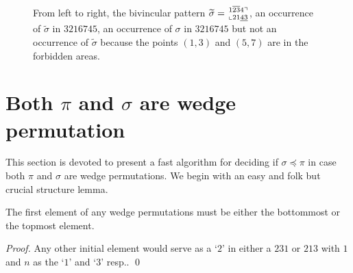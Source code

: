 \documentclass[a4paper]{llncs}
\newcommand\BV[2]{\genfrac{}{}{0pt}{}{#1}{#2}}
\begin{document}
\begin{figure}[t]



    	\caption[Example pattern matching]{
    		From left to right,
    		the bivincular pattern $\widetilde{\sigma} = \BV{1\overline{23}4\urcorner}{\llcorner 21\underline{43}  }$, an occurrence of $\widetilde{\sigma}$ in $3216745$, an occurrence of $\sigma$ in $3216745$ but not an occurrence of $\widetilde{\sigma}$ because the points $(1,3)$ and $(5,7)$ are in the forbidden areas.}
    	\label{example:bivincular pattern matching}
\end{figure}


\section{Both $\pi$ and $\sigma$ are wedge permutation}
\label{section:both are (213,231)-avoiding}



This section is devoted to present a fast algorithm for deciding if
$\sigma \preceq \pi$
in case both $\pi$ and $\sigma$ are wedge permutations.
We begin with an easy and folk  but crucial structure lemma.

\begin{lemma} %
\label{lemma:first element is 1 or n}
The first element of any wedge permutations
must be either the bottommost or the topmost element.
\end{lemma}

\begin{proof} %
Any other initial element would serve as a `$2$' in either a
$231$ or $213$ with $1$ and $n$ as the `$1$' and `$3$' resp..
\qed
\end{proof}
\end{document}
